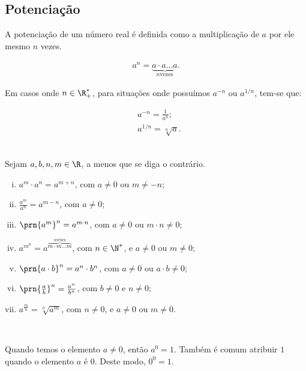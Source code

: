 \subsection{Potenciação}

A potenciação de um número real é definida como a multiplicação de $a$ por ele mesmo $n$ vezes.  

\begin{align*}
    a^n = \underbrace{a \cdot a  \dots  a}_{n \text{
    vezes}}.
\end{align*}

Em casos onde $n \in \R^*_+$, para situações onde possuímos $a^{-n}$ ou $a^{1/n}$, tem-se que:

\begin{align*}
    &a^{-n} = \frac{1}{a^n}; \\
    &a^{1/n} = \sqrt[n] a.
\end{align*}\\

\begin{proposition}[Propriedades]
    Sejam $a, b, n, m \in \R$, a menos que se diga o contrário.
    \begin{enumerate}[i.]
        \item $a^m \cdot a^n = a^{m+n}$, com $a \ne 0$ ou $m \ne -n$;
        \item $\frac {a^m}{a^n} = a^{m-n}$, com $a \ne 0$;
        \item $\prn{a^m}^n = a^{m\cdot n}$, com $a \ne 0$ ou $m\cdot n \ne 0$;
        \item $a^{m^n} = a^{\overbrace{m \cdot m  \dots  m}^{n \text{
        vezes}}}$, com $n \in \N^*$, e $a \ne 0$ ou $m \ne 0$;
        \item $\prn{a \cdot b }^n= a^n \cdot b^n$, com $a \ne 0$ ou $a \cdot b \ne 0$;
        \item $\prn{\frac a b }^n = \frac {a^n} {b^n}$, com $b \ne 0$ e $n \ne 0$; 
        \item $a^{\frac m n} = \sqrt[n]{a^m}$, com $n \neq 0$, e $a \ne 0$ ou $m \ne 0$.
    \end{enumerate}
\end{proposition} 

~\\

\begin{remark}
Quando temos o elemento $a \neq 0$, então $a^0 = 1$. Também é comum atribuir $1$ quando o elemento $a$ é $0$. Deste modo, $0^0 =1$.
\end{remark} 

